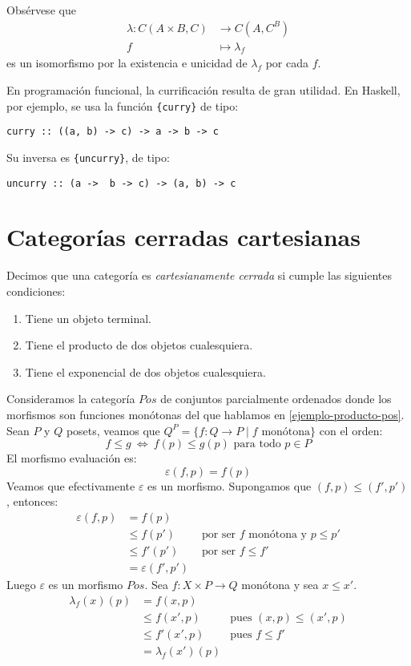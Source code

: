 \documentclass[12pt, twoside]{book}
\newcommand{\newterm}[1]{\index{#1}\emph{#1}}
\newcommand{\code}[1]{\Verb+{#1}+}
\newcommand{\sii}{{\ \Leftrightarrow\ }}
\begin{document}
Obsérvese que
\begin{align*}
\lambda \colon C(A \times B, C) & \to C(A,C^B)\\
f & \mapsto \lambda_f
\end{align*}
es un isomorfismo por la existencia e unicidad de $\lambda_f$ por cada $f$.

En programación funcional, la currificación resulta de gran utilidad.
En Haskell, por ejemplo, se usa la función \code{curry} de tipo:
\begin{verbatim}
curry :: ((a, b) -> c) -> a -> b -> c
\end{verbatim}
Su inversa es \code{uncurry}, de tipo:
\begin{verbatim}
uncurry :: (a ->  b -> c) -> (a, b) -> c
\end{verbatim}

\section{Categorías cerradas cartesianas}
\begin{definition}
Decimos que una categoría es \newterm{cartesianamente cerrada} si cumple las siguientes condiciones:
\begin{enumerate}
\item Tiene un objeto terminal.
\item Tiene el producto de dos objetos cualesquiera.
\item Tiene el exponencial de dos objetos cualesquiera.
\end{enumerate}
\end{definition}

\begin{example}
Consideramos la categoría $Pos$ de conjuntos parcialmente ordenados donde los morfismos son funciones monótonas del que hablamos en \ref{ejemplo-producto-pos}.
Sean $P$ y $Q$ posets, veamos que $Q^P = \{ f \colon Q \to P \mid f \text{ monótona}\}$ con el orden:
\[ f \leq g \sii f(p) \leq g(p) \text{ para todo }p \in P \]
El morfismo evaluación es:
\[ \varepsilon (f,p) = f(p) \]
Veamos que efectivamente $\varepsilon$ es un morfismo.
Supongamos que $(f,p) \leq (f',p')$, entonces:
\begin{align*}
\varepsilon(f,p) & = f(p) & \\
& \leq f(p') & \text{ por ser }f\text{ monótona y }p\leq p'\\
& \leq f'(p') & \text{ por ser }f \leq f'\\
& = \varepsilon(f',p')
\end{align*}
Luego $\varepsilon$ es un morfismo $Pos$.
Sea $f \colon X \times P \to Q$ monótona y sea $x \leq x'$.
\begin{align*}
\lambda_f(x)(p) & = f(x,p) & \\
& \leq f(x',p) & \text{pues }(x,p) \leq (x',p)\\
& \leq f'(x',p) & \text{pues }f \leq f'\\
& = \lambda_f(x')(p)
\end{align*}
\end{example}
\end{document}
